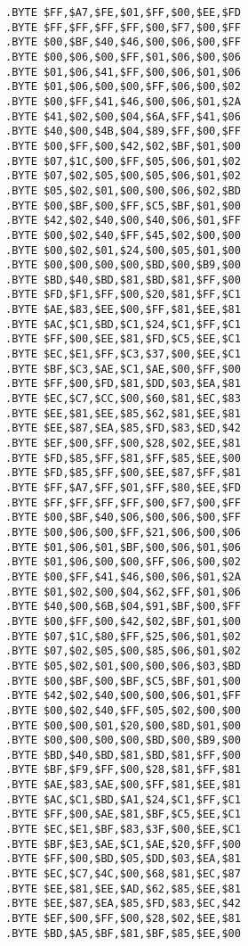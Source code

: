 \begin{minipage}[b]{0.33\linewidth}
\begin{lrbox}{\mybox}%
\begin{lstlisting}[basicstyle=\ttfamily\tiny]
.BYTE $FF,$A7,$FE,$01,$FF,$00,$EE,$FD
.BYTE $FF,$FF,$FF,$FF,$00,$F7,$00,$FF
.BYTE $00,$BF,$40,$46,$00,$06,$00,$FF
.BYTE $00,$06,$00,$FF,$01,$06,$00,$06
.BYTE $01,$06,$41,$FF,$00,$06,$01,$06
.BYTE $01,$06,$00,$00,$FF,$06,$00,$02
.BYTE $00,$FF,$41,$46,$00,$06,$01,$2A
.BYTE $41,$02,$00,$04,$6A,$FF,$41,$06
.BYTE $40,$00,$4B,$04,$89,$FF,$00,$FF
.BYTE $00,$FF,$00,$42,$02,$BF,$01,$00
.BYTE $07,$1C,$00,$FF,$05,$06,$01,$02
.BYTE $07,$02,$05,$00,$05,$06,$01,$02
.BYTE $05,$02,$01,$00,$00,$06,$02,$BD
.BYTE $00,$BF,$00,$FF,$C5,$BF,$01,$00
.BYTE $42,$02,$40,$00,$40,$06,$01,$FF
.BYTE $00,$02,$40,$FF,$45,$02,$00,$00
.BYTE $00,$02,$01,$24,$00,$05,$01,$00
.BYTE $00,$00,$00,$00,$BD,$00,$B9,$00
.BYTE $BD,$40,$BD,$81,$BD,$81,$FF,$00
.BYTE $FD,$F1,$FF,$00,$20,$81,$FF,$C1
.BYTE $AE,$83,$EE,$00,$FF,$81,$EE,$81
.BYTE $AC,$C1,$BD,$C1,$24,$C1,$FF,$C1
.BYTE $FF,$00,$EE,$81,$FD,$C5,$EE,$C1
.BYTE $EC,$E1,$FF,$C3,$37,$00,$EE,$C1
.BYTE $BF,$C3,$AE,$C1,$AE,$00,$FF,$00
.BYTE $FF,$00,$FD,$81,$DD,$03,$EA,$81
.BYTE $EC,$C7,$CC,$00,$60,$81,$EC,$83
.BYTE $EE,$81,$EE,$85,$62,$81,$EE,$81
.BYTE $EE,$87,$EA,$85,$FD,$83,$ED,$42
.BYTE $EF,$00,$FF,$00,$28,$02,$EE,$81
.BYTE $FD,$85,$FF,$81,$FF,$85,$EE,$00
.BYTE $FD,$85,$FF,$00,$EE,$87,$FF,$81
.BYTE $FF,$A7,$FF,$01,$FF,$80,$EE,$FD
.BYTE $FF,$FF,$FF,$FF,$00,$F7,$00,$FF
.BYTE $00,$BF,$40,$06,$00,$06,$00,$FF
.BYTE $00,$06,$00,$FF,$21,$06,$00,$06
.BYTE $01,$06,$01,$BF,$00,$06,$01,$06
.BYTE $01,$06,$00,$00,$FF,$06,$00,$02
.BYTE $00,$FF,$41,$46,$00,$06,$01,$2A
.BYTE $01,$02,$00,$04,$62,$FF,$01,$06
.BYTE $40,$00,$6B,$04,$91,$BF,$00,$FF
.BYTE $00,$FF,$00,$42,$02,$BF,$01,$00
.BYTE $07,$1C,$80,$FF,$25,$06,$01,$02
.BYTE $07,$02,$05,$00,$85,$06,$01,$02
.BYTE $05,$02,$01,$00,$00,$06,$03,$BD
.BYTE $00,$BF,$00,$BF,$C5,$BF,$01,$00
.BYTE $42,$02,$40,$00,$00,$06,$01,$FF
.BYTE $00,$02,$40,$FF,$05,$02,$00,$00
.BYTE $00,$00,$01,$20,$00,$8D,$01,$00
.BYTE $00,$00,$00,$00,$BD,$00,$B9,$00
.BYTE $BD,$40,$BD,$81,$BD,$81,$FF,$00
.BYTE $BF,$F9,$FF,$00,$28,$81,$FF,$81
.BYTE $AE,$83,$AE,$00,$FF,$81,$EE,$81
.BYTE $AC,$C1,$BD,$A1,$24,$C1,$FF,$C1
.BYTE $FF,$00,$AE,$81,$BF,$C5,$EE,$C1
.BYTE $EC,$E1,$BF,$83,$3F,$00,$EE,$C1
.BYTE $BF,$E3,$AE,$C1,$AE,$20,$FF,$00
.BYTE $FF,$00,$BD,$05,$DD,$03,$EA,$81
.BYTE $EC,$C7,$4C,$00,$68,$81,$EC,$87
.BYTE $EE,$81,$EE,$AD,$62,$85,$EE,$81
.BYTE $EE,$87,$EA,$85,$FD,$83,$EC,$42
.BYTE $EF,$00,$FF,$00,$28,$02,$EE,$81
.BYTE $BD,$A5,$BF,$81,$BF,$85,$EE,$00

\end{lstlisting}
\end{lrbox}
\end{minipage}

